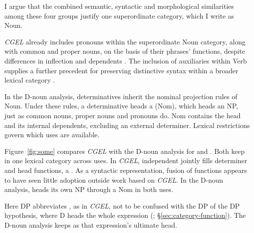 \documentclass[12pt]{article}
\begin{document}
I argue that the combined semantic, syntactic and morphological similarities among these four groups justify one superordinate category, which I write as Noun.

\textit{CGEL} already includes pronouns within the superordinate Noun category, along with common and proper nouns, on the basis of their phrases' functions, despite differences in inflection and dependents \citep[327--328]{huddleston2002}. The inclusion of auxiliaries within Verb supplies a further precedent for preserving distinctive syntax within a broader lexical category \citep{pullumwilson1977}.

In the D-noun analysis, determinatives inherit the nominal projection rules of Noun. Under these rules, a determinative heads a  (Nom), which heads an NP, just as common nouns, proper nouns and pronouns do. Nom contains the head and its internal dependents, excluding an external determiner. Lexical restrictions govern which uses are available.

Figure~\ref{fig:some} compares \textit{CGEL} with the D-noun analysis for  and . Both keep  in one lexical category across uses. In \textit{CGEL}, independent  jointly fills determiner and head functions, a  \citep[410--412]{huddleston2002}. As a syntactic representation, fusion of functions appears to have seen little adoption outside work based on \textit{CGEL}. In the D-noun analysis,  heads its own NP through a Nom in both uses.

Here DP abbreviates , as in \textit{CGEL}, not to be confused with the DP of the DP hypothesis, where D heads the whole expression  (\citealp{abney1987}; §\ref{sec:category-function}). The D-noun analysis keeps  as that expression's ultimate head.
\end{document}
